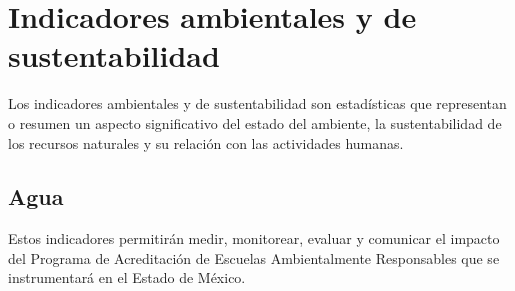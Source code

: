 \section{Indicadores ambientales y de sustentabilidad}

  Los indicadores ambientales y de sustentabilidad son estadísticas que representan o resumen un aspecto significativo del estado del ambiente, 
  la sustentabilidad de los recursos naturales y su relación con las actividades humanas.

\subsection{Agua}

Estos indicadores permitirán medir, monitorear, evaluar y comunicar el impacto del Programa de Acreditación de Escuelas Ambientalmente Responsables que se instrumentará en el Estado de México.\\

